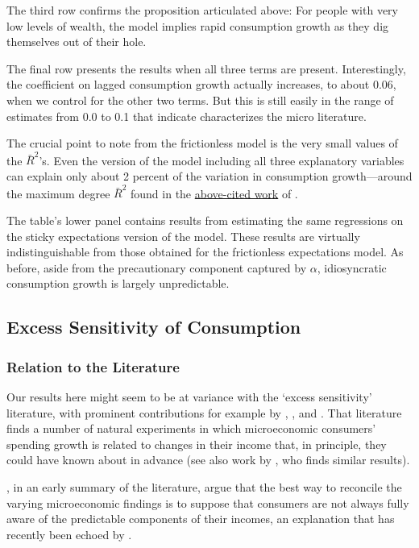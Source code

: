 \documentclass[titlepage]{article}
\begin{document}
The third row confirms the proposition articulated above: For people with very low levels of wealth, the model implies rapid consumption growth as they dig themselves out of their hole.

The final row presents the results when all three terms are present.  Interestingly, the coefficient on lagged consumption growth actually increases, to about 0.06, when we control for the other two terms.  But this is still easily in the range of estimates from 0.0 to 0.1 that \cite{hrsHabit} indicate characterizes the micro literature.

The crucial point to note from the frictionless model is the very small values of the $\bar{R}^{2}$'s.  Even the version of the model including all three explanatory variables can explain only about 2 percent of the variation in consumption growth---around the maximum degree $\bar{R}^{2}$ found in the \hyperlink{dynanR2}{above-cited work} of \cite{dynanHabits}.

The table's lower panel contains results from estimating the same regressions on the sticky expectations version of the model.  These results are virtually indistinguishable from those obtained for the frictionless expectations model.  As before, aside from the precautionary component captured by $\alpha$, idiosyncratic consumption growth is largely unpredictable.

\subsection{Excess Sensitivity of Consumption} \label{sec:ExcessSens}

\subsubsection{Relation to the Literature}

Our results here might seem to be at variance with the `excess sensitivity' literature, with prominent contributions for example by \cite{soulelesTaxRefunds}, \cite{jpsTax}, and \cite{psjmMPC2008}.  That literature finds a number of natural experiments in which microeconomic consumers' spending growth is related to changes in their income that, in principle, they could have known about in advance (see also work by \cite{kuengTaxnews}, who finds similar results).

\cite{BrowningColladoAER}, in an early summary of the literature, argue that the best way to reconcile the varying microeconomic findings is to suppose that consumers are not always fully aware of the predictable components of their incomes, an explanation that has recently been echoed by \cite{parker25million}.
\end{document}
